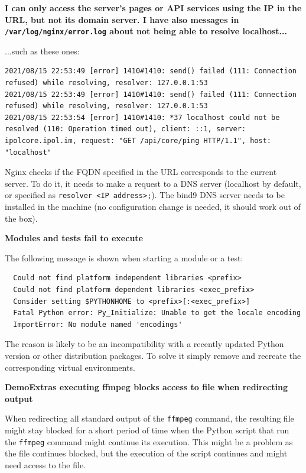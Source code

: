 \documentclass[a4paper,12pt]{article}
\begin{document}
\textbf{I can only access the server's pages or API services using the IP in the URL, but not its domain server. I have also messages in {\tt /var/log/nginx/error.log} about not being able to resolve localhost...}

...such as these ones:
\begin{verbatim}
2021/08/15 22:53:49 [error] 1410#1410: send() failed (111: Connection refused) while resolving, resolver: 127.0.0.1:53
2021/08/15 22:53:49 [error] 1410#1410: send() failed (111: Connection refused) while resolving, resolver: 127.0.0.1:53
2021/08/15 22:53:54 [error] 1410#1410: *37 localhost could not be resolved (110: Operation timed out), client: ::1, server: ipolcore.ipol.im, request: "GET /api/core/ping HTTP/1.1", host: "localhost"
\end{verbatim}



Nginx checks if the FQDN specified in the URL corresponds to the current server. To do it, it needs to make a request to a DNS server (localhost by default, or specified as {\tt resolver <IP address>;}). The bind9 DNS server needs to be installed in the machine (no configuration change is needed, it should work out of the box).
\vspace{0.5cm}

\textbf{Modules and tests fail to execute}

The following message is shown when starting a module or a test:

\begin{verbatim}  
  Could not find platform independent libraries <prefix>
  Could not find platform dependent libraries <exec_prefix>
  Consider setting $PYTHONHOME to <prefix>[:<exec_prefix>]
  Fatal Python error: Py_Initialize: Unable to get the locale encoding
  ImportError: No module named 'encodings'
\end{verbatim}

The reason is likely to be an incompatibility with a recently updated Python version or other distribution packages. To solve it simply remove and recreate the corresponding virtual environments.

\textbf{DemoExtras executing ffmpeg blocks access to file when redirecting output}

When redirecting all standard output of the {\tt ffmpeg} command, the resulting file might stay blocked for a short period of time when the Python script that run the {\tt ffmpeg} command might continue its execution. This might be a problem as the file continues blocked, but the execution of the script continues and might need access to the file.
\end{document}
